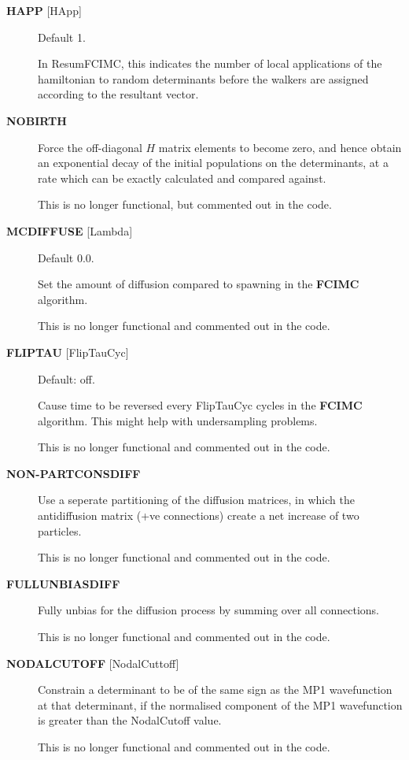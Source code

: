 \documentclass[openany,a4paper,10pt,english]{manual}
\begin{document}
\begin{description}
\item[\textbf{HAPP} {[}HApp{]}] \leavevmode
Default 1.

In ResumFCIMC, this indicates the number of local applications of the
hamiltonian to random determinants before the walkers are assigned
according to the resultant vector.

\item[\textbf{NOBIRTH}] \leavevmode
Force the off-diagonal $H$ matrix elements to become zero,
and hence obtain an exponential decay of the initial populations
on the determinants, at a rate which can be exactly calculated and
compared against.

This is no longer functional, but commented out in the
code.

\item[\textbf{MCDIFFUSE} {[}Lambda{]}] \leavevmode
Default 0.0.

Set the amount of diffusion compared to spawning in the \textbf{FCIMC}
algorithm.

This is no longer functional and commented out in the code.

\item[\textbf{FLIPTAU} {[}FlipTauCyc{]}] \leavevmode
Default: off.

Cause time to be reversed every FlipTauCyc cycles in the \textbf{FCIMC}
algorithm. This might help with undersampling problems.

This is no longer functional and commented out in the code.

\item[\textbf{NON-PARTCONSDIFF}] \leavevmode
Use a seperate partitioning of the diffusion matrices, in which
the antidiffusion matrix (+ve connections) create a net increase of
two particles.

This is no longer functional and commented out in the code.

\item[\textbf{FULLUNBIASDIFF}] \leavevmode
Fully unbias for the diffusion process by summing over all connections.

This is no longer functional and commented out in the code.

\item[\textbf{NODALCUTOFF} {[}NodalCuttoff{]}] \leavevmode
Constrain a determinant to be of the same sign as the MP1
wavefunction at that determinant, if the normalised component of
the MP1 wavefunction is greater than the NodalCutoff value.

This is no longer functional and commented out in the code.


\end{description}
\end{document}
